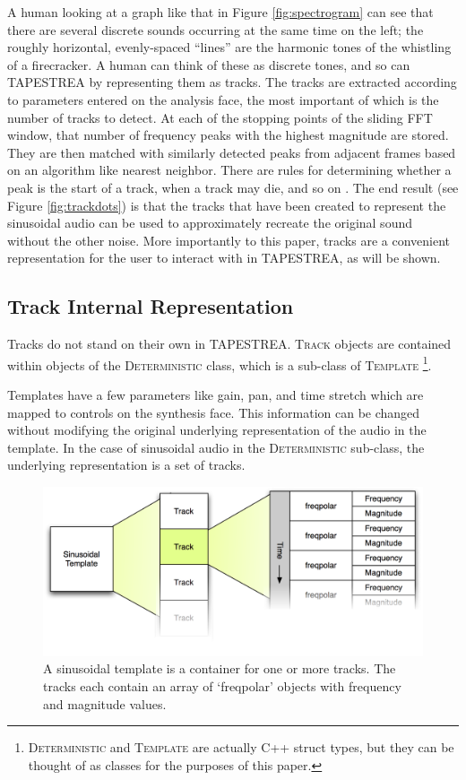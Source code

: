 \documentclass{article}
\newcommand{\noun}[1]{\textsc{#1}}
\begin{document}
A human looking at a graph like that in Figure \ref{fig:spectrogram} can see
that there are several discrete sounds occurring at the same time on the left;
the roughly horizontal, evenly-spaced ``lines'' are the harmonic tones of the
whistling of a firecracker.  A human can think of these as discrete tones, and
so can TAPESTREA by representing them as tracks. The tracks are extracted
according to parameters entered on the analysis face, the most important of
which is the number of tracks to detect. At each of the stopping points of the
sliding FFT window, that number of frequency peaks with the highest magnitude
are stored. They are then matched with similarly detected peaks from adjacent
frames based on an algorithm like nearest neighbor. There are rules for
determining whether a peak is the start of a track, when a track may die, and
so on \cite{recompose}. The end result (see Figure \ref{fig:trackdots}) is that
the tracks that have been created to represent the sinusoidal audio can be used
to approximately recreate the original sound without the other noise.  More
importantly to this paper, tracks are a convenient representation for the
user to interact with in TAPESTREA, as will be shown.

\subsection{Track Internal Representation}

Tracks do not stand on their own in TAPESTREA. \noun{Track} objects are
contained within objects of the \noun{Deterministic} class, which is a
sub-class of \noun{Template} \footnote{\noun{Deterministic} and \noun{Template}
are actually C++ struct types, but they can be thought of as classes for the
purposes of this paper.}.

Templates have a few parameters like gain, pan, and time stretch which are
mapped to controls on the synthesis face. This information can be changed
without modifying the original underlying representation of the audio in the
template. In the case of sinusoidal audio in the \noun{Deterministic}
sub-class, the underlying representation is a set of tracks.

\begin{figure}
\includegraphics[scale=0.4]{images/deterministic}

\caption{\label{fig:sinusoidal}A sinusoidal template is a container for one or
more tracks. The tracks each contain an array of `freqpolar' objects with
frequency and magnitude values.}
\end{figure}
\end{document}
